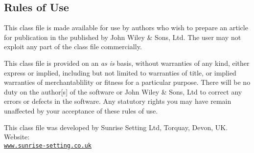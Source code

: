 \documentclass[times]{fldauth}
\begin{document}
\subsection{Rules of Use}
This class file is made available for use by authors who wish to
prepare an article for publication in the \emph{\journalnamelc}
published by John Wiley \& Sons, Ltd. The user may not exploit any
part of the class file commercially.

This class file is provided on an \emph{as is}  basis, without
warranties of any kind, either express or implied, including but
not limited to warranties of title, or implied  warranties of
merchantablility or fitness for a particular purpose. There will
be no duty on the author[s] of the software or  John Wiley \&
Sons, Ltd to correct any errors or defects in the software. Any
statutory  rights you may have remain unaffected by your
acceptance of these rules of use.

\ack This class file was developed by Sunrise Setting Ltd,
Torquay, Devon, UK. Website:\\
\href{http://www.sunrise-setting.co.uk}{\texttt{www.sunrise-setting.co.uk}}
\end{document}
